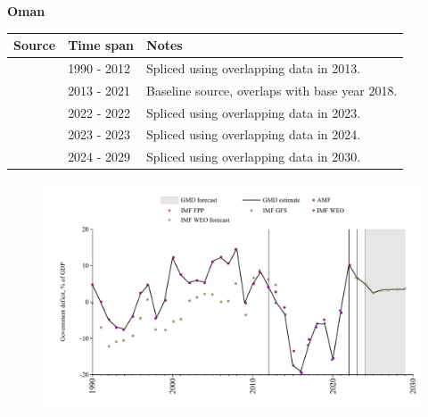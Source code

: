 \documentclass[12pt,a4paper,landscape]{article}
\begin{document}
\begin{adjustbox}{max totalsize={\paperwidth}{\paperheight},center}
\begin{minipage}[t][\textheight][t]{\textwidth}
\vspace*{0.5cm}
{}
\begin{center}
{\Large\bfseries Oman}
\end{center}
\vspace{0.5cm}
\begin{table}[H]
\centering
\small
\begin{tabular}{|l|l|l|}
\hline
\textbf{Source} & \textbf{Time span} & \textbf{Notes} \\
\hline
\rowcolor{white}\cite{IMF_WEO}& 1990 - 2012 &Spliced using overlapping data in 2013.\\
\rowcolor{lightgray}\cite{AMF}& 2013 - 2021 &Baseline source, overlaps with base year 2018.\\
\rowcolor{white}\cite{IMF_WEO}& 2022 - 2022 &Spliced using overlapping data in 2023.\\
\rowcolor{lightgray}\cite{IMF_FPP}& 2023 - 2023 &Spliced using overlapping data in 2024.\\
\rowcolor{white}\cite{IMF_WEO_forecast}& 2024 - 2029 &Spliced using overlapping data in 2030.\\
\hline
\end{tabular}
\end{table}
\begin{figure}[H]
\centering
\includegraphics[width=\textwidth,height=0.6\textheight,keepaspectratio]{graphs/OMN_govdef_GDP.pdf}
\end{figure}
\end{minipage}
\end{adjustbox}
\end{document}
